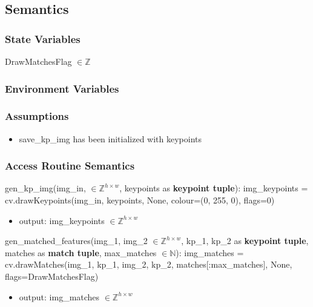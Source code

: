 \documentclass[12pt, titlepage]{article}
\begin{document}
\subsection{Semantics}

\subsubsection{State Variables}

DrawMatchesFlag $\in \mathbb{Z}$

\subsubsection{Environment Variables}


\subsubsection{Assumptions}
\begin{itemize}
  \item save\_kp\_img has been initialized with keypoints
\end{itemize}


\subsubsection{Access Routine Semantics}

\noindent gen\_kp\_img(img\_in, $\in \mathbb{Z}^{h \times w}$, keypoints 
as \textbf{keypoint tuple}):\newline
img\_keypoints = cv.drawKeypoints(img\_in, keypoints, None, colour=(0, 255, 0), 
flags=0)
\begin{itemize}
  \item output: img\_keypoints $\in \mathbb{Z}^{h \times w}$
\end{itemize}


\noindent gen\_matched\_features(img\_1, img\_2 $\in \mathbb{Z}^{h \times w}$,
kp\_1, kp\_2 as \textbf{keypoint tuple}, matches as \textbf{match tuple}, 
max\_matches $\in \mathbb{N}$): \newline 
img\_matches = cv.drawMatches(img\_1, kp\_1, img\_2, kp\_2, matches[:max\_matches], 
None, flags=DrawMatchesFlag) 
\begin{itemize}
  \item output: img\_matches $\in \mathbb{Z}^{h \times w}$
\end{itemize}
\end{document}
